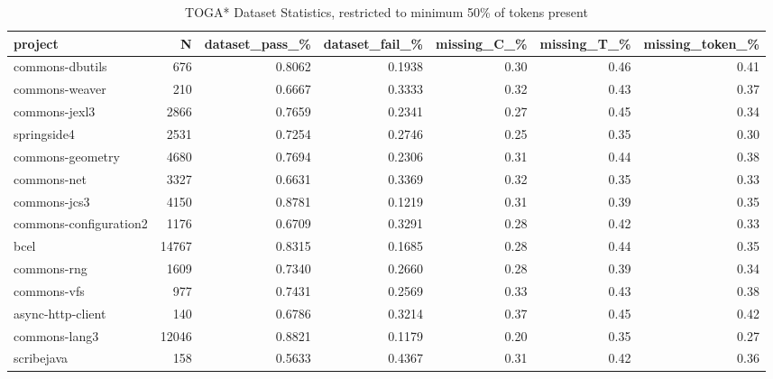 \begin{table*}
\centering
\caption{TOGA* Dataset Statistics, restricted to minimum 50\% of tokens present}
\label{tab:toga_stats_50}
\begin{tabular}{lrrrrrr}
\toprule
                project &       N &  dataset\_pass\_\% &  dataset\_fail\_\% &  missing\_C\_\% &  missing\_T\_\% &  missing\_token\_\% \\
\midrule
        commons-dbutils &     676 &          0.8062 &          0.1938 &         0.30 &         0.46 &             0.41 \\
         commons-weaver &     210 &          0.6667 &          0.3333 &         0.32 &         0.43 &             0.37 \\
          commons-jexl3 &    2866 &          0.7659 &          0.2341 &         0.27 &         0.45 &             0.34 \\
            springside4 &    2531 &          0.7254 &          0.2746 &         0.25 &         0.35 &             0.30 \\
       commons-geometry &    4680 &          0.7694 &          0.2306 &         0.31 &         0.44 &             0.38 \\
            commons-net &    3327 &          0.6631 &          0.3369 &         0.32 &         0.35 &             0.33 \\
           commons-jcs3 &    4150 &          0.8781 &          0.1219 &         0.31 &         0.39 &             0.35 \\
 commons-configuration2 &    1176 &          0.6709 &          0.3291 &         0.28 &         0.42 &             0.33 \\
                   bcel &   14767 &          0.8315 &          0.1685 &         0.28 &         0.44 &             0.35 \\
            commons-rng &    1609 &          0.7340 &          0.2660 &         0.28 &         0.39 &             0.34 \\
            commons-vfs &     977 &          0.7431 &          0.2569 &         0.33 &         0.43 &             0.38 \\
      async-http-client &     140 &          0.6786 &          0.3214 &         0.37 &         0.45 &             0.42 \\
          commons-lang3 &   12046 &          0.8821 &          0.1179 &         0.20 &         0.35 &             0.27 \\
             scribejava &     158 &          0.5633 &          0.4367 &         0.31 &         0.42 &             0.36 \\

\end{tabular}
\end{table*}
